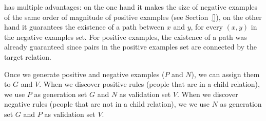 has multiple advantages: on the one hand it makes the size of negative examples of the same order of magnitude of positive examples (see Section~\ref{}), on the other hand it guarantees the existence of a path between $x$ and $y$, for every $(x,y)$ in the negative examples set. For positive examples, the existence of a path was already guaranteed since pairs in the positive examples set are connected by the target relation.

Once we generate positive and negative examples ($P$ and $N$), we can assign them to $G$ and $V$. When we discover positive rules (people that are in a child relation), we use $P$ as generation set $G$ and $N$ as validation set $V$. When we discover negative rules (people that are not in a child relation), we we use $N$ as generation set $G$ and $P$ as validation set $V$.

